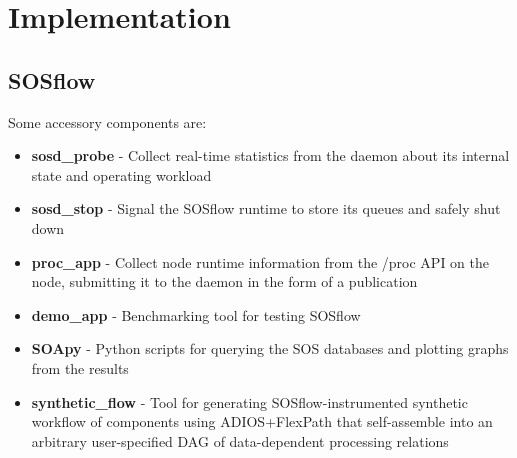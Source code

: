 %




\section{Implementation}


\subsection{SOSflow}


Some accessory components are:
%
\begin{itemize}
    \item \textbf{sosd\_probe} - Collect real-time statistics from the daemon about
      its internal state and operating workload
    \item \textbf{sosd\_stop} - Signal the SOSflow runtime to store its queues and
      safely shut down
    \item \textbf{proc\_app} - Collect node runtime information from
      the /proc API on the node, submitting it to the daemon in the
      form of a publication
    \item \textbf{demo\_app} - Benchmarking tool for testing SOSflow
    \item \textbf{SOApy} - Python scripts for querying the SOS databases and plotting
      graphs from the results
    \item \textbf{synthetic\_flow} - Tool for generating SOSflow-instrumented
      synthetic workflow of components using ADIOS+FlexPath
      that self-assemble into an arbitrary  user-specified DAG of
      data-dependent processing relations
\end{itemize}

